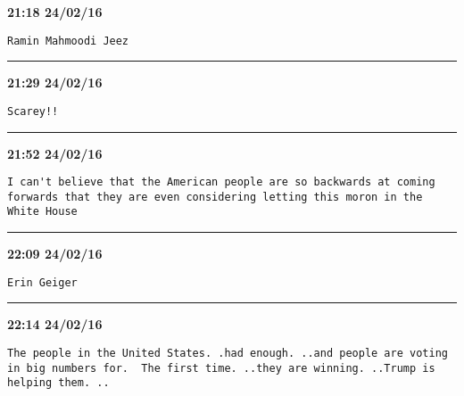 \begin{adjustwidth}{0cm}{0cm}
\footnotesize \textbf{21:18 24/02/16}

\begin{lstlisting}[breaklines, breakatwhitespace, basicstyle=\small, frame=leftline]
Ramin Mahmoodi Jeez
\end{lstlisting}
\end{adjustwidth}

\hrule%

\begin{adjustwidth}{0cm}{0cm}
\footnotesize \textbf{21:29 24/02/16}

\begin{lstlisting}[breaklines, breakatwhitespace, basicstyle=\small, frame=leftline]
Scarey!!
\end{lstlisting}
\end{adjustwidth}

\hrule%

\begin{adjustwidth}{0cm}{0cm}
\footnotesize \textbf{21:52 24/02/16}

\begin{lstlisting}[breaklines, breakatwhitespace, basicstyle=\small, frame=leftline]
I can't believe that the American people are so backwards at coming forwards that they are even considering letting this moron in the White House
\end{lstlisting}
\end{adjustwidth}

\hrule%

\begin{adjustwidth}{0cm}{0cm}
\footnotesize \textbf{22:09 24/02/16}

\begin{lstlisting}[breaklines, breakatwhitespace, basicstyle=\small, frame=leftline]
Erin Geiger
\end{lstlisting}
\end{adjustwidth}

\hrule%

\begin{adjustwidth}{0cm}{0cm}
\footnotesize \textbf{22:14 24/02/16}

\begin{lstlisting}[breaklines, breakatwhitespace, basicstyle=\small, frame=leftline]
The people in the United States. .had enough. ..and people are voting in big numbers for.  The first time. ..they are winning. ..Trump is helping them. ..
\end{lstlisting}
\end{adjustwidth}

